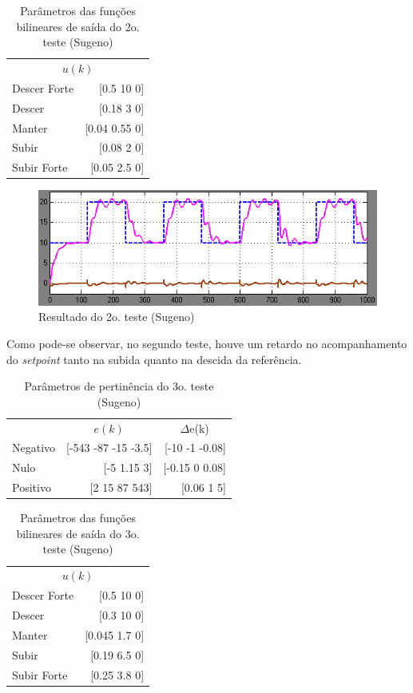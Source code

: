 \documentclass[
	twoside,				%
	twocolumn,				%
	english,				%
	brazil,					%
]{article}
\begin{document}
\begin{table}[!h]
\caption{Parâmetros das funções bilineares de saída do 2o. teste (Sugeno)}
\centering
\begin{tabular}{lr}
\toprule
\multicolumn{2}{c}{$u(k)$} \\
\cmidrule(r){1-2}
Descer Forte & [0.5 10 0] \\
Descer & [0.18 3 0] \\
Manter & [0.04 0.55 0] \\
Subir & [0.08 2 0] \\
Subir Forte & [0.05 2.5 0] \\
\bottomrule
\end{tabular}
\end{table}

\begin{figure}[!h]
    \centering
    \includegraphics[width=\columnwidth]{sugeno2.png}
    \caption { Resultado do 2o. teste (Sugeno) }
\end{figure}

Como pode-se observar, no segundo teste, houve um retardo no acompanhamento do \textit{setpoint} tanto na subida quanto na descida da referência.

\begin{table}[!h]
\caption{Parâmetros de pertinência do 3o. teste \\ (Sugeno)}
\centering
\begin{tabular}{lrr}
\toprule
& \multicolumn{1}{c}{$e(k)$} & \multicolumn{1}{c}{$\Delta$e(k)} \\
\cmidrule(r){1-3} 
Negativo & [-543 -87 -15 -3.5] & [-10 -1 -0.08] \\
Nulo & [-5 1.15 3] & [-0.15 0 0.08] \\
Positivo & [2 15 87 543] & [0.06 1 5] \\
\bottomrule
\end{tabular}
\end{table}

\begin{table}[!h]
\caption{Parâmetros das funções bilineares de saída do 3o. teste (Sugeno)}
\centering
\begin{tabular}{lr}
\toprule
\multicolumn{2}{c}{$u(k)$} \\
\cmidrule(r){1-2}
Descer Forte & [0.5 10 0] \\
Descer & [0.3 10 0] \\
Manter & [0.045 1.7 0] \\
Subir & [0.19 6.5 0] \\
Subir Forte & [0.25 3.8 0] \\
\bottomrule
\end{tabular}
\end{table}
\end{document}
